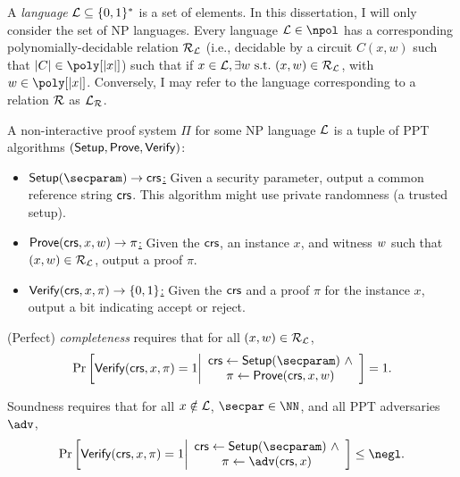 A \emph{language} $\mathcal{L} \subseteq \{0,1\}^*$ is a set of elements. In this dissertation, I will only consider the set of NP languages. Every language $\Lang \in \npol$ has a corresponding polynomially-decidable relation $\mathcal{R}_{\mathcal{L}}$ (i.e., decidable by a circuit $C(x,w)$ such that $\sizeof{C} \in \poly[\sizeof{x}]$) such that if $x \in \mathcal{L}, \exists w \mathrm{~s.t.~} (x,w) \in \mathcal{R}_{\mathcal{L}}$, with $w \in \poly[\sizeof{x}]$. Conversely, I may refer to the language corresponding to a relation $\mathcal{R}$ as $\mathcal{L}_{\mathcal{R}}$.

\begin{definition} A non-interactive proof system $\Pi$ for some NP language $\mathcal{L}$ is a tuple of PPT algorithms $({\mathsf{Setup}}, \mathsf{Prove}, {\mathsf{Verify}})$:
    \begin{itemize}
        \item \underline{$\Setup(\secparam) \rightarrow \crs$:} Given a security parameter, output a common reference string $\mathsf{crs}$. This algorithm might use private randomness (a trusted setup).
        \item \underline{$\mathsf{Prove}(\mathsf{crs}, x, w) \rightarrow \pi$:} Given the $\mathsf{crs}$, an instance $x$, and witness $w$ such that $(x, w) \in \mathcal{R}_{\mathcal{L}}$, output a proof $\pi$.
        \item \underline{${\mathsf{Verify}}(\mathsf{crs}, x,\pi) \rightarrow \{0,1\}$:} Given the $\mathsf{crs}$ and a proof $\pi$ for the instance $x$, output a bit indicating accept or reject.
    \end{itemize}

(Perfect) \emph{completeness} requires that for all $(x,w) \in \mathcal{R}_{\mathcal{L}}$,
\begin{equation*}
    \Pr\left[
        \vrfy(\crs, x, \pi)=1 
        \middle| 
        \begin{array}{c}
            \crs \gets \Setup(\secparam)~\land\\
            \pi \gets \prove(\crs, x, \witness)
        \end{array}
    \right] = 1.
\end{equation*}
\end{definition}

\begin{definition}\label{def:soundness}
    Soundness requires that for all $x \notin \mathcal{L}$, $\secpar \in \NN$, and all PPT adversaries $\adv$,
\begin{equation*}
    \Pr\left[
        \vrfy(\crs, x, \pi)=1 
        \middle| 
        \begin{array}{c}
            \crs \gets \Setup(\secparam)~\land\\
            \pi \gets \adv(\crs, x)
        \end{array}
    \right] \leq \negl.
\end{equation*}
\end{definition}

